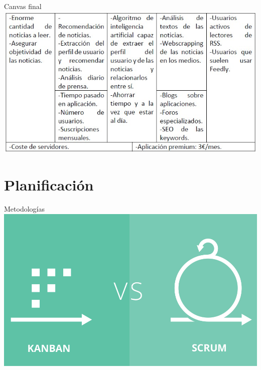 \documentclass[12pt]{beamer}
\begin{document}
		\begin{frame}{Canvas final}
            \includegraphics[width=\textwidth,height=0.8\textheight,keepaspectratio]{img/canvas/canvas_final}
		\end{frame}
	
	\section{Planificación}
		\begin{frame}{Metodologías}
			\includegraphics[width=\textwidth,height=0.8\textheight,keepaspectratio]{img/scrum/scrum_vs_kanban}
		\end{frame}
\end{document}
